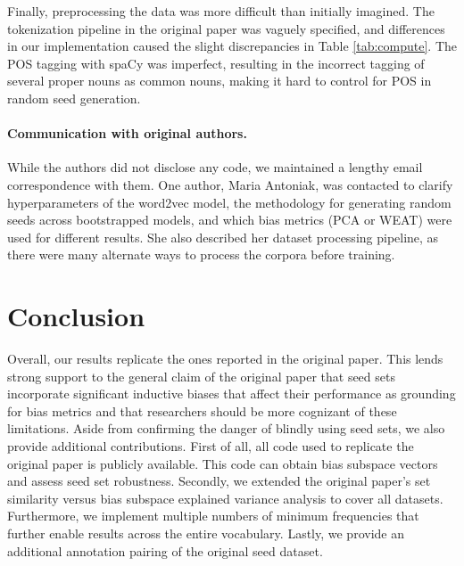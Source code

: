 Finally, preprocessing the data was more difficult than initially imagined. The tokenization
pipeline in the original paper was vaguely specified, and differences in our implementation caused
the slight discrepancies in Table \ref{tab:compute}. The POS tagging with spaCy was imperfect,
resulting in the incorrect tagging of several proper nouns as common nouns, making it hard to
control for POS in random seed generation.

\paragraph{Communication with original authors.} While the authors did not disclose any code, we
maintained a lengthy email correspondence with them. One author, Maria Antoniak, was contacted to
clarify hyperparameters of the word2vec model, the methodology for generating random seeds across
bootstrapped models, and which bias metrics (PCA or WEAT) were used for different results. She also
described her dataset processing pipeline, as there were many alternate ways to process the corpora
before training.

\section{Conclusion}

Overall, our results replicate the ones reported in the original paper. This lends strong support to
the general claim of the original paper that seed sets incorporate significant inductive biases that
affect their performance as grounding for bias metrics and that researchers should be more cognizant
of these limitations. Aside from confirming the danger of blindly using seed sets, we also provide
additional contributions. First of all, all code used to replicate the original paper is publicly
available. This code can obtain bias subspace vectors and assess seed set robustness. Secondly, we
extended the original paper's set similarity versus bias subspace explained variance analysis to
cover all datasets. Furthermore, we implement multiple numbers of minimum frequencies that further
enable results across the entire vocabulary. Lastly, we provide an additional annotation pairing of
the original seed dataset.

